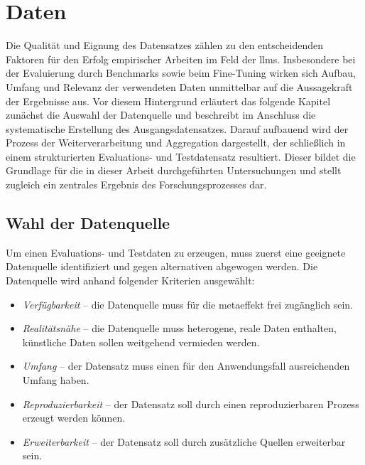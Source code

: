\chapter{Daten}\label{ch:daten}

Die Qualität und Eignung des Datensatzes zählen zu den entscheidenden Faktoren für den Erfolg empirischer Arbeiten im Feld der \glspl{llm}.
Insbesondere bei der Evaluierung durch Benchmarks sowie beim Fine-Tuning wirken sich Aufbau, Umfang und Relevanz der verwendeten Daten unmittelbar auf die Aussagekraft der Ergebnisse aus.
Vor diesem Hintergrund erläutert das folgende Kapitel zunächst die Auswahl der Datenquelle und beschreibt im Anschluss die systematische Erstellung des Ausgangsdatensatzes.
Darauf aufbauend wird der Prozess der Weiterverarbeitung und Aggregation dargestellt, der schließlich in einem strukturierten Evaluations- und Testdatensatz resultiert.
Dieser bildet die Grundlage für die in dieser Arbeit durchgeführten Untersuchungen und stellt zugleich ein zentrales Ergebnis des Forschungsprozesses dar.


\section{Wahl der Datenquelle}\label{sec:wahl-der-datenquelle}

Um einen Evaluations- und Testdaten zu erzeugen, muss zuerst eine geeignete Datenquelle identifiziert und gegen alternativen abgewogen werden.
Die Datenquelle wird anhand folgender Kriterien ausgewählt:

\begin{itemize}
    \item \textit{Verfügbarkeit} -- die Datenquelle muss für die metaeffekt frei zugänglich sein.
    \item \textit{Realitätsnähe} -- die Datenquelle muss heterogene, reale Daten enthalten, künstliche Daten sollen weitgehend vermieden werden.
    \item \textit{Umfang} -- der Datensatz muss einen für den Anwendungsfall ausreichenden Umfang haben.
    \item \textit{Reproduzierbarkeit} -- der Datensatz soll durch einen reproduzierbaren Prozess erzeugt werden können.
    \item \textit{Erweiterbarkeit} -- der Datensatz soll durch zusätzliche Quellen erweiterbar sein.
\end{itemize}

